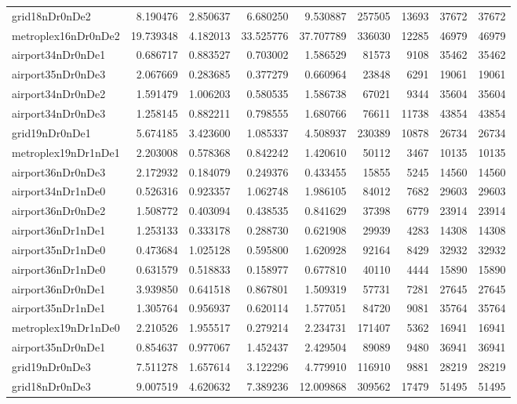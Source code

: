 \begin{longtable}{|l|r|r|r|r|r|r|r|r|}
grid18nDr0nDe2 & 8.190476 & 2.850637 & 6.680250 & 9.530887 & 257505 & 13693 & 37672 & 37672 \\
metroplex16nDr0nDe2 & 19.739348 & 4.182013 & 33.525776 & 37.707789 & 336030 & 12285 & 46979 & 46979 \\
airport34nDr0nDe1 & 0.686717 & 0.883527 & 0.703002 & 1.586529 & 81573 & 9108 & 35462 & 35462 \\
airport35nDr0nDe3 & 2.067669 & 0.283685 & 0.377279 & 0.660964 & 23848 & 6291 & 19061 & 19061 \\
airport34nDr0nDe2 & 1.591479 & 1.006203 & 0.580535 & 1.586738 & 67021 & 9344 & 35604 & 35604 \\
airport34nDr0nDe3 & 1.258145 & 0.882211 & 0.798555 & 1.680766 & 76611 & 11738 & 43854 & 43854 \\
grid19nDr0nDe1 & 5.674185 & 3.423600 & 1.085337 & 4.508937 & 230389 & 10878 & 26734 & 26734 \\
metroplex19nDr1nDe1 & 2.203008 & 0.578368 & 0.842242 & 1.420610 & 50112 & 3467 & 10135 & 10135 \\
airport36nDr0nDe3 & 2.172932 & 0.184079 & 0.249376 & 0.433455 & 15855 & 5245 & 14560 & 14560 \\
airport34nDr1nDe0 & 0.526316 & 0.923357 & 1.062748 & 1.986105 & 84012 & 7682 & 29603 & 29603 \\
airport36nDr0nDe2 & 1.508772 & 0.403094 & 0.438535 & 0.841629 & 37398 & 6779 & 23914 & 23914 \\
airport36nDr1nDe1 & 1.253133 & 0.333178 & 0.288730 & 0.621908 & 29939 & 4283 & 14308 & 14308 \\
airport35nDr1nDe0 & 0.473684 & 1.025128 & 0.595800 & 1.620928 & 92164 & 8429 & 32932 & 32932 \\
airport36nDr1nDe0 & 0.631579 & 0.518833 & 0.158977 & 0.677810 & 40110 & 4444 & 15890 & 15890 \\
airport36nDr0nDe1 & 3.939850 & 0.641518 & 0.867801 & 1.509319 & 57731 & 7281 & 27645 & 27645 \\
airport35nDr1nDe1 & 1.305764 & 0.956937 & 0.620114 & 1.577051 & 84720 & 9081 & 35764 & 35764 \\
metroplex19nDr1nDe0 & 2.210526 & 1.955517 & 0.279214 & 2.234731 & 171407 & 5362 & 16941 & 16941 \\
airport35nDr0nDe1 & 0.854637 & 0.977067 & 1.452437 & 2.429504 & 89089 & 9480 & 36941 & 36941 \\
grid19nDr0nDe3 & 7.511278 & 1.657614 & 3.122296 & 4.779910 & 116910 & 9881 & 28219 & 28219 \\
grid18nDr0nDe3 & 9.007519 & 4.620632 & 7.389236 & 12.009868 & 309562 & 17479 & 51495 & 51495 \\

\end{longtable}
